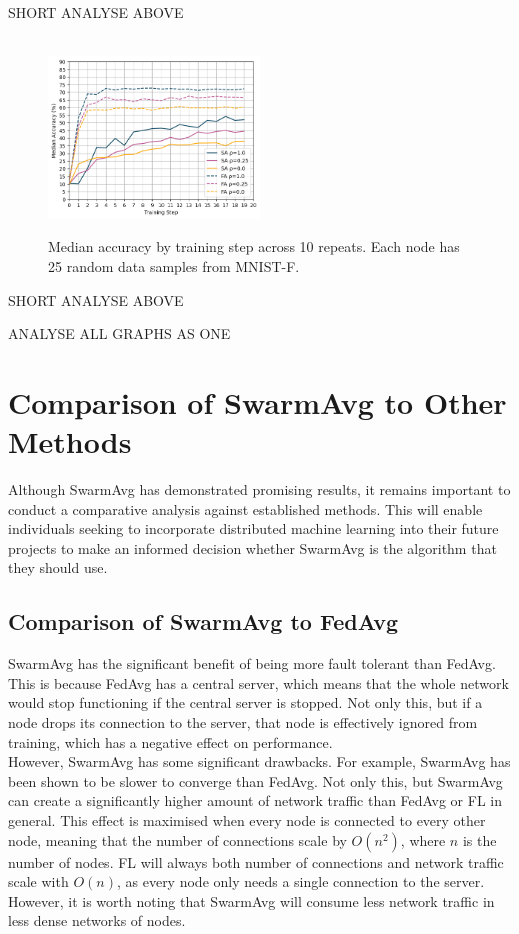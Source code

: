\documentclass[letterpaper, 10 pt, conference]{ieeeconf}  %
\begin{document}
SHORT ANALYSE ABOVE

\begin{figure}[H] 
	 \\
	\includegraphics[width=0.5\textwidth]{conf_sparse_ns25_cl3}
	\caption{Median accuracy by training step across 10 repeats. Each node has 25 random data samples from MNIST-F.}
	\label{aeg9}
\end{figure}

SHORT ANALYSE ABOVE

ANALYSE ALL GRAPHS AS ONE

\section{Comparison of SwarmAvg to Other Methods}
Although SwarmAvg has demonstrated promising results, it remains important to conduct a comparative analysis against established methods. This will enable individuals seeking to incorporate distributed machine learning into their future projects to make an informed decision whether SwarmAvg is the algorithm that they should use.

\subsection{Comparison of SwarmAvg to FedAvg}
SwarmAvg has the significant benefit of being more fault tolerant than FedAvg. This is because FedAvg has a central server, which means that the whole network would stop functioning if the central server is stopped. Not only this, but if a node drops its connection to the server, that node is effectively ignored from training, which has a negative effect on performance. \\

However, SwarmAvg has some significant drawbacks. For example, SwarmAvg has been shown to be slower to converge than FedAvg. Not only this, but SwarmAvg can create a significantly higher amount of network traffic than FedAvg or FL in general. This effect is maximised when every node is connected to every other node, meaning that the number of connections scale by $O(n^2)$, where $n$ is the number of nodes. FL will always both number of connections and network traffic scale with $O(n)$, as every node only needs a single connection to the server. However, it is worth noting that SwarmAvg will consume less network traffic in less dense networks of nodes. \\
\end{document}
